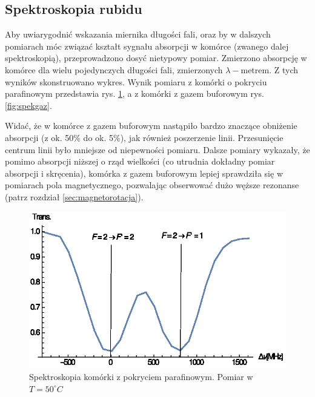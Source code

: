 \documentclass[a4paper,10pt]{article}
\begin{document}
\subsection{Spektroskopia rubidu}

Aby uwiarygodnić wskazania miernika długości fali, oraz by w dalszych pomiarach móc związać kształt sygnału absorpcji w komórce (zwanego dalej spektroskopią), przeprowadzono dosyć nietypowy pomiar.
Zmierzono absorpcję w komórce dla wielu pojedynczych długości fali, zmierzonych $\lambda-$metrem. Z tych wyników skonstruowano wykres.
Wynik pomiaru z komórki o pokryciu parafinowym przedstawia rys. \ref{fig:spekpara}, a z komórki z gazem buforowym rys. \ref{fig:spekgaz}.

Widać, że w komórce z gazem buforowym nastąpiło bardzo znaczące obniżenie absorpcji (z ok. 50\% do ok. 5\%), jak również poszerzenie linii. Przesunięcie centrum linii było mniejsze od niepewności pomiaru. Dalsze pomiary wykazały, że pomimo absorpcji niższej o rząd wielkości (co utrudnia dokładny pomiar absorpcji i skręcenia), komórka z gazem buforowym lepiej sprawdziła się w pomiarach pola magnetycznego, pozwalając obserwować dużo węższe rezonanse (patrz rozdział \ref{sec:magnetorotacja}). 


\begin{figure}[h!]
\centering
 \includegraphics[width=\textwidth]{spek_para.eps}
 \caption{Spektroskopia komórki z pokryciem parafinowym. Pomiar w $T=50^{\circ}C$}
 \label{fig:spekpara}
\end{figure}
\end{document}
